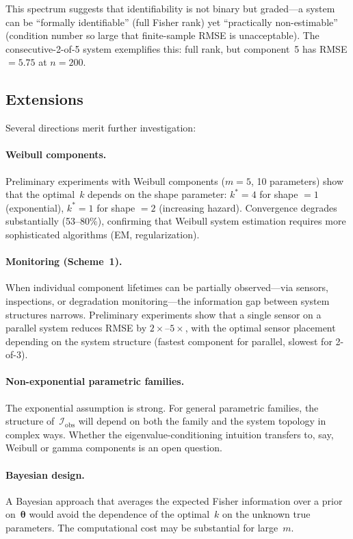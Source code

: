 \documentclass[12pt]{article}
\theoremstyle{definition}
\theoremstyle{remark}
\newcommand{\bthet}{\boldsymbol{\theta}}
\begin{document}
This spectrum suggests that identifiability is not binary but
graded---a system can be ``formally identifiable'' (full Fisher rank)
yet ``practically non-estimable'' (condition number so large that
finite-sample RMSE is unacceptable).  The consecutive-2-of-5 system
exemplifies this: full rank, but component~5 has RMSE $= 5.75$ at
$n = 200$.


\subsection{Extensions}
\label{sec:extensions}

Several directions merit further investigation:

\paragraph{Weibull components.}
Preliminary experiments with Weibull components ($m = 5$, 10
parameters) show that the optimal~$k$ depends on the shape parameter:
$k^* = 4$ for shape $= 1$ (exponential), $k^* = 1$ for shape $= 2$
(increasing hazard).  Convergence degrades substantially
(53--80\%), confirming that Weibull system estimation requires more
sophisticated algorithms (EM, regularization).

\paragraph{Monitoring (Scheme~1).}
When individual component lifetimes can be partially observed---via
sensors, inspections, or degradation monitoring---the information
gap between system structures narrows.  Preliminary experiments
show that a single sensor on a parallel system
reduces RMSE by $2\times$--$5\times$, with the optimal sensor
placement depending on the system structure (fastest component for
parallel, slowest for 2-of-3).

\paragraph{Non-exponential parametric families.}
The exponential assumption is strong.  For general parametric
families, the structure of~$\mathcal{I}_{\mathrm{obs}}$ will depend
on both the family and the system topology in complex ways.  Whether
the eigenvalue-conditioning intuition transfers to, say, Weibull or
gamma components is an open question.

\paragraph{Bayesian design.}
A Bayesian approach that averages the expected Fisher information over
a prior on~$\bthet$ \citep{ZhangMeeker2006} would avoid the
dependence of the optimal~$k$ on the unknown true parameters.  The
computational cost may be substantial for large~$m$.
\end{document}
